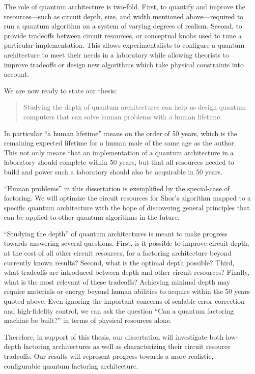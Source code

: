 The role of quantum architecture is two-fold. First,
to quantify and improve the resources---such as circuit depth,
size, and width mentioned above---required to run a quantum
algorithm on a system of varying degrees of realism. Second, to provide
tradeoffs between circuit resources, or conceptual knobs used to tune a
particular implementation. This allows experimentalists to configure a
quantum architecture to meet their needs in a laboratory while allowing
theorists to improve tradeoffs or design new algorithms which take
physical constraints into account.


We are now ready to state our thesis:

\begin{quote}
Studying the depth of quantum architectures can help us design quantum
computers that can solve
human problems with a human lifetime.
\end{quote}

In particular ``a human lifetime'' means on the order of 50 years, which is
the remaining expected lifetime for a human male of the same age as the
author. This not only means that an implementation of a quantum architecture
in a laboratory should complete within 50 years, but that all resources
needed to build and power such a laboratory should also be acquirable in
50 years.

``Human problems'' in this dissertation is exemplified by the special-case of
factoring. We will optimize the circuit resources for Shor's algorithm mapped
to a specific quantum architecture with the hope of discovering general
principles that can be applied to other quantum algorithms in the future.

``Studying the depth'' of quantum architectures is meant to
make progress towards answering several questions.
First, is it possible to improve circuit depth, at the cost of all
other circuit resources, for a factoring architecture
beyond currently known results?
Second, what is the optimal depth possible?
Third, what tradeoffs are introduced between depth and other circuit
resources? Finally, what is the most relevant of these tradeoffs?
Achieving minimal depth may require materials or energy beyond
human abilities to acquire within the 50 years quoted above. Even ignoring the
important concerns of scalable error-correction and high-fidelity control,
we can ask the question ``Can a quantum factoring machine be built?'' in
terms of physical resources alone.

 Therefore,
in support of this thesis,
our dissertation will investigate both low-depth factoring architectures
as well as characterizing their circuit resource tradeoffs.
Our results will represent progress towards a more realistic, configurable
quantum factoring architecture.

